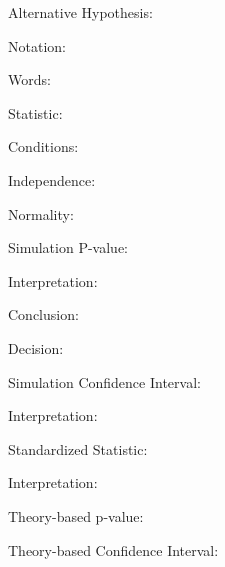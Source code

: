 \documentclass[
]{report}
\newcommand{\rgi}{\hspace{24pt}}  %
\begin{document}
\vspace{0.5in}

\rgi Alternative Hypothesis:

\rgi \rgi Notation:

\vspace{0.3in}

\rgi \rgi Words:

\vspace{0.5in}

\rgi Statistic:

\vspace{0.3in}

\rgi Conditions:

\rgi \rgi Independence:

\vspace{0.8in}

\rgi \rgi Normality:

\vspace{0.8in}

\rgi Simulation P-value:

\vspace{0.3in}

\rgi \rgi Interpretation:

\vspace{0.8in}

\rgi \rgi Conclusion:

\vspace{0.8in}

\rgi \rgi Decision:

\vspace{0.3in}

\rgi Simulation Confidence Interval:

\vspace{0.3in}

\rgi \rgi Interpretation:

\vspace{0.8in}

\rgi Standardized Statistic:

\vspace{0.3in}

\rgi \rgi Interpretation:

\vspace{0.8in}

\rgi Theory-based p-value:

\vspace{0.3in}

\rgi Theory-based Confidence Interval:

\vspace{0.3in}
\end{document}
